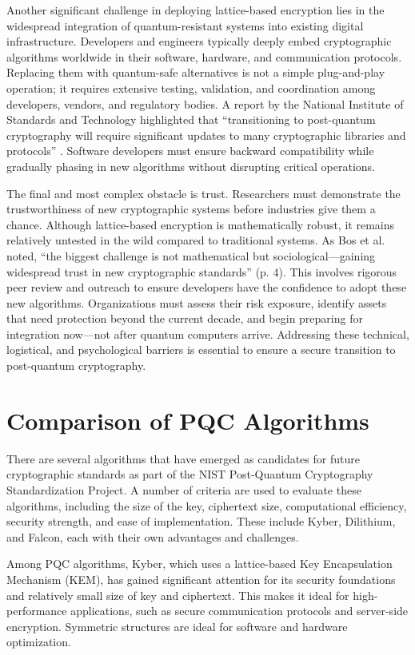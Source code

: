 \documentclass[conference]{IEEEtran}
\begin{document}
Another significant challenge in deploying lattice-based encryption lies in the widespread integration of quantum-resistant systems into existing digital infrastructure. Developers and engineers typically deeply embed cryptographic algorithms worldwide in their software, hardware, and communication protocols. Replacing them with quantum-safe alternatives is not a simple plug-and-play operation; it requires extensive testing, validation, and coordination among developers, vendors, and regulatory bodies. A report by the National Institute of Standards and Technology highlighted that ``transitioning to post-quantum cryptography will require significant updates to many cryptographic libraries and protocols'' \cite{Chen2016}. Software developers must ensure backward compatibility while gradually phasing in new algorithms without disrupting critical operations.

The final and most complex obstacle is trust. Researchers must demonstrate the trustworthiness of new cryptographic systems before industries give them a chance. Although lattice-based encryption is mathematically robust, it remains relatively untested in the wild compared to traditional systems. As Bos et al. \cite{Bos2018} noted, ``the biggest challenge is not mathematical but sociological—gaining widespread trust in new cryptographic standards'' (p. 4). This involves rigorous peer review and outreach to ensure developers have the confidence to adopt these new algorithms. Organizations must assess their risk exposure, identify assets that need protection beyond the current decade, and begin preparing for integration now—not after quantum computers arrive. Addressing these technical, logistical, and psychological barriers is essential to ensure a secure transition to post-quantum cryptography.


\section{Comparison of PQC Algorithms}

There are several algorithms that have emerged as candidates for future cryptographic standards as part of the NIST Post-Quantum Cryptography Standardization Project. A number of criteria are used to evaluate these algorithms, including the size of the key, ciphertext size, computational efficiency, security strength, and ease of implementation\cite{NIST2022}. These include Kyber, Dilithium, and Falcon, each with their own advantages and challenges.

Among PQC algorithms, Kyber, which uses a lattice-based Key Encapsulation Mechanism (KEM), has gained significant attention for its security foundations and relatively small size of key and ciphertext. This makes it ideal for high-performance applications, such as secure communication protocols and server-side encryption. Symmetric structures are ideal for software and hardware optimization.
\end{document}
